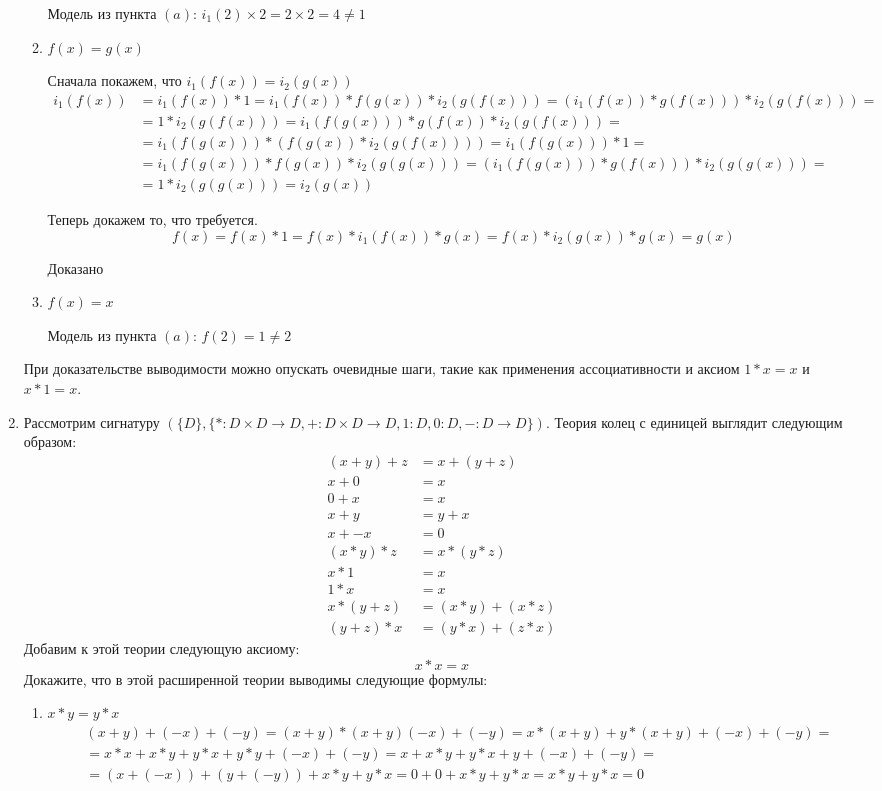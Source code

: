 \begin{enumerate}
\begin{enumerate}
Модель из пункта $(a)$: $i_1(2) \times 2 = 2 \times 2 = 4 \neq 1$

\item $f(x) = g(x)$

Сначала покажем, что $i_1(f(x)) = i_2(g(x))$
\begin{align*}
	i_1(f(x)) &= i_1(f(x)) * 1 = i_1(f(x)) * f(g(x)) * i_2(g(f(x))) = (i_1(f(x)) * g(f(x))) * i_2(g(f(x))) = \\
	&= 1 * i_2(g(f(x))) = i_1(f(g(x))) * g(f(x)) * i_2(g(f(x))) = \\
	&= i_1(f(g(x))) * (f(g(x)) * i_2(g(f(x)))) = i_1(f(g(x))) * 1 = \\
	&= i_1(f(g(x))) * f(g(x)) * i_2(g(g(x))) = (i_1(f(g(x))) * g(f(x))) * i_2(g(g(x))) = \\
	&= 1 * i_2(g(g(x))) = i_2(g(x))
\end{align*}

Теперь докажем то, что требуется.
\begin{equation*}
	f(x) = f(x) * 1 = f(x) * i_1(f(x)) * g(x) = f(x) * i_2(g(x)) * g(x) = g(x)
\end{equation*}

Доказано

\item $f(x) = x$

Модель из пункта $(a)$: $f(2) = 1 \neq 2$

\end{enumerate}
При доказательстве выводимости можно опускать очевидные шаги, такие как применения ассоциативности и аксиом $1 * 
x = x$ и $x * 1 = x$.

\item Рассмотрим сигнатуру $(\{D\}, \{ * : D \times D \to D, + : D \times D \to D, 1 : D, 0 : D, - : D \to D \})$.
    Теория колец с единицей выглядит следующим образом:
\begin{align*}
(x + y) + z & = x + (y + z) \\
x + 0 & = x \\
0 + x & = x \\
x + y & = y + x \\
x + -x & = 0 \\
(x * y) * z & = x * (y * z) \\
x * 1 & = x \\
1 * x & = x \\
x * (y + z) & = (x * y) + (x * z) \\
(y + z) * x & = (y * x) + (z * x)
\end{align*}
Добавим к этой теории следующую аксиому:
\[ x * x = x \]
Докажите, что в этой расширенной теории выводимы следующие формулы:
\begin{enumerate}
\item $x * y = y * x$
\begin{align*}
&(x + y) + (-x) + (-y) = (x + y)*(x + y) (-x) + (-y) = x*(x + y) + y*(x + y) + (-x) + (-y) = \\
&=x * x + x * y + y * x + y * y + (-x) + (-y) = x + x * y + y * x + y + (-x) + (-y) = \\
&=(x + (-x)) + (y + (-y)) + x * y + y * x = 0 + 0 + x * y + y * x = x * y + y * x = 0
\end{align*}


\end{enumerate}
\end{enumerate}
